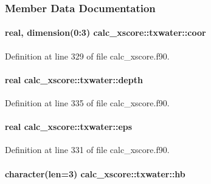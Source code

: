 \subsubsection{Member Data Documentation}
\hypertarget{structcalc__xscore_1_1txwater_a5656c062071d4991624590bc26dca59a}{
\paragraph[{coor}]{\setlength{\rightskip}{0pt plus 5cm}real, dimension(0\-:3) calc\-\_\-xscore\-::txwater\-::coor}}\label{structcalc__xscore_1_1txwater_a5656c062071d4991624590bc26dca59a}


Definition at line 329 of file calc\-\_\-xscore.\-f90.

\hypertarget{structcalc__xscore_1_1txwater_a73da2224f62044ec6ed75b62bad3a4ea}{
\paragraph[{depth}]{\setlength{\rightskip}{0pt plus 5cm}real calc\-\_\-xscore\-::txwater\-::depth}}\label{structcalc__xscore_1_1txwater_a73da2224f62044ec6ed75b62bad3a4ea}


Definition at line 335 of file calc\-\_\-xscore.\-f90.

\hypertarget{structcalc__xscore_1_1txwater_a96942ebf92f985949f9c7fafe1213228}{
\paragraph[{eps}]{\setlength{\rightskip}{0pt plus 5cm}real calc\-\_\-xscore\-::txwater\-::eps}}\label{structcalc__xscore_1_1txwater_a96942ebf92f985949f9c7fafe1213228}


Definition at line 331 of file calc\-\_\-xscore.\-f90.

\hypertarget{structcalc__xscore_1_1txwater_a3b924dafc12f54d1d849131337403ded}{
\paragraph[{hb}]{\setlength{\rightskip}{0pt plus 5cm}character(len=3) calc\-\_\-xscore\-::txwater\-::hb}}\label{structcalc__xscore_1_1txwater_a3b924dafc12f54d1d849131337403ded}



